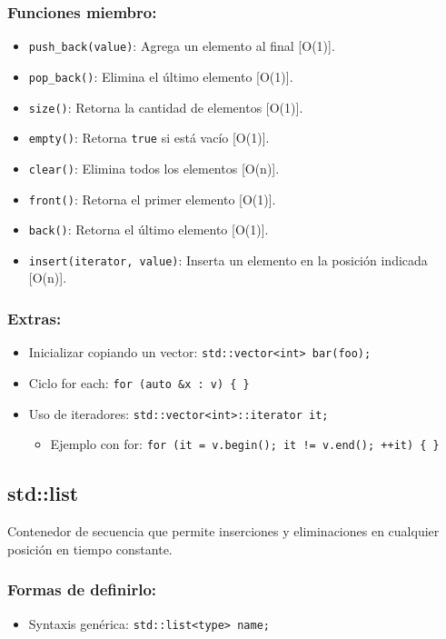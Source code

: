 \subsubsection*{Funciones miembro:}
\begin{itemize}
  \item \texttt{push\_back(value)}: Agrega un elemento al final [O(1)].
  \item \texttt{pop\_back()}: Elimina el último elemento [O(1)].
  \item \texttt{size()}: Retorna la cantidad de elementos [O(1)].
  \item \texttt{empty()}: Retorna \texttt{true} si está vacío [O(1)].
  \item \texttt{clear()}: Elimina todos los elementos [O(n)].
  \item \texttt{front()}: Retorna el primer elemento [O(1)].
  \item \texttt{back()}: Retorna el último elemento [O(1)].
  \item \texttt{insert(iterator, value)}: Inserta un elemento en la posición indicada [O(n)].
\end{itemize}

\subsubsection*{Extras: }
\begin{itemize}
  \item Inicializar copiando un vector: \texttt{std::vector<int> bar(foo);}
  \item Ciclo for each: \texttt{for (auto \&x : v) \{ \}}
  \item Uso de iteradores: \texttt{std::vector<int>::iterator it;}
  \begin{itemize}
    \item Ejemplo con for: \texttt{for (it = v.begin(); it != v.end(); ++it) \{ \}}
  \end{itemize}
\end{itemize}

\subsection{std::list}
\label{subsec:std_list}
Contenedor de secuencia que permite inserciones y eliminaciones en cualquier posición en tiempo constante. 

\subsubsection*{Formas de definirlo:}
\begin{itemize}
  \item Syntaxis genérica: \texttt{std::list<type> name;}
\end{itemize}


